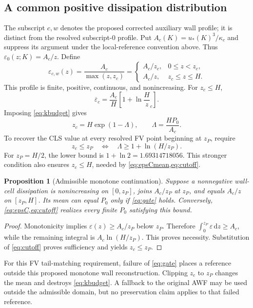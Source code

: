 \documentclass[11pt,a4paper]{article}
\numberwithin{equation}{section}
\newtheorem{proposition}{Proposition}[section]
\newcommand{\dd}{\mathrm{d}}
\newcommand{\eps}{\varepsilon}
\newcommand{\ust}{u_*}
\newcommand{\kc}{\kappa_c}
\newcommand{\avg}[1]{\overline{#1}}
\newcommand{\Aref}{A_c}
\newcommand{\ycut}{z_c}
\newcommand{\ECw}{\eps_{c,w}}
\begin{document}
\subsection{A common positive dissipation distribution}
The subscript $c,w$ denotes the proposed corrected auxiliary wall
profile; it is distinct from the resolved subscript-$0$ profile.
Put $\Aref(K)=\ust(K)^3/\kc$ and suppress its argument under the
local-reference convention above. Thus $\eps_0(z;K)=\Aref/z$. Define
\begin{equation}
 \boxed{\ECw(z)=\frac{\Aref}{\max(z,\ycut)}
 =\begin{cases}
 \Aref/\ycut,&0\leq z<\ycut,\\
 \Aref/z,&\ycut\leq z\leq H.
 \end{cases}}
 \label{eq:epsC}
\end{equation}
This profile is finite, positive, continuous, and nonincreasing.
For $\ycut\leq H$,
\begin{equation}
 \avg\eps_c=\frac{\Aref}{H}\left[1+\ln\frac H\ycut\right].
 \label{eq:epsCmean}
\end{equation}
Imposing \cref{eq:kbudget} gives
\begin{equation}
 \boxed{\ycut=H\exp(1-\Lambda),\qquad
 \Lambda=\frac{HP_0}{\Aref}.}
 \label{eq:cutoff}
\end{equation}
To recover the CLS value at every resolved FV point beginning at $z_P$, require
\begin{equation}
 \boxed{\ycut\leq z_P
 \quad\Longleftrightarrow\quad
 \Lambda\geq1+\ln(H/z_P).}
 \label{eq:gate}
\end{equation}
For $z_P=H/2$, the lower bound is $1+\ln2=1.69314718056$.
This stronger condition also ensures $\ycut\leq H$, needed by
\cref{eq:epsCmean,eq:cutoff}.

\begin{proposition}[Admissible monotone continuation]
Suppose a nonnegative wall-cell dissipation is nonincreasing on $[0,z_P]$,
joins $\Aref/z_P$ at $z_P$, and equals $\Aref/z$ on $[z_P,H]$.
Its mean can equal $P_0$ only if \cref{eq:gate} holds.
Conversely, \cref{eq:epsC,eq:cutoff} realizes every finite $P_0$
satisfying this bound.
\end{proposition}
\begin{proof}
Monotonicity implies $\eps(z)\geq\Aref/z_P$ below $z_P$. Therefore
$\int_0^{z_P}\eps\,\dd z\geq\Aref$, while the remaining integral is
$\Aref\ln(H/z_P)$. This proves necessity. Substitution of
\cref{eq:cutoff} proves sufficiency and yields $\ycut\leq z_P$.
\end{proof}
For this FV tail-matching requirement, failure of \cref{eq:gate} places a reference outside this proposed
monotone wall reconstruction. Clipping $\ycut$ to $z_P$ changes the mean
and destroys \cref{eq:kbudget}. A fallback to the original AWF may be
used outside the admissible domain, but no preservation claim applies to
that failed reference.
\end{document}
